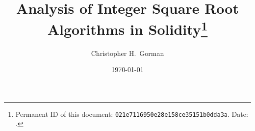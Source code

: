 
\author{Christopher H.~Gorman}
\title{Analysis of Integer Square Root Algorithms in Solidity\thanks{%
Permanent ID of this document:
\texttt{021e7116950e28e158ce35151b0dda3a}.
Date: {\protect{}\protect\DTMtoday}.}
}
\date{\today}






